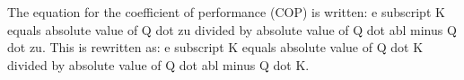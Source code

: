 The equation for the coefficient of performance (COP) is written:  
e subscript K equals absolute value of Q dot zu divided by absolute value of Q dot abl minus Q dot zu.  
This is rewritten as:  
e subscript K equals absolute value of Q dot K divided by absolute value of Q dot abl minus Q dot K.